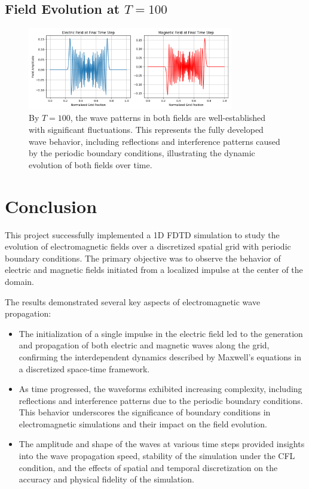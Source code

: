 \documentclass{article}[a4paper]
\begin{document}
\subsection{Field Evolution at \( T = 100 \)}
\begin{figure}[H]
    \centering
    \includegraphics[width=0.8\textwidth]{materials/Figure_100.png}
    \caption{By \( T = 100 \), the wave patterns in both fields are well-established with significant fluctuations. This represents the fully developed wave behavior, including reflections and interference patterns caused by the periodic boundary conditions, illustrating the dynamic evolution of both fields over time.}
\end{figure}

\section{Conclusion}

This project successfully implemented a 1D FDTD simulation to study the evolution of electromagnetic fields over a discretized spatial grid with periodic boundary conditions. The primary objective was to observe the behavior of electric and magnetic fields initiated from a localized impulse at the center of the domain.

The results demonstrated several key aspects of electromagnetic wave propagation:
\begin{itemize}
    \item The initialization of a single impulse in the electric field led to the generation and propagation of both electric and magnetic waves along the grid, confirming the interdependent dynamics described by Maxwell's equations in a discretized space-time framework.
    \item As time progressed, the waveforms exhibited increasing complexity, including reflections and interference patterns due to the periodic boundary conditions. This behavior underscores the significance of boundary conditions in electromagnetic simulations and their impact on the field evolution.
    \item The amplitude and shape of the waves at various time steps provided insights into the wave propagation speed, stability of the simulation under the CFL condition, and the effects of spatial and temporal discretization on the accuracy and physical fidelity of the simulation.
\end{itemize}
\end{document}
